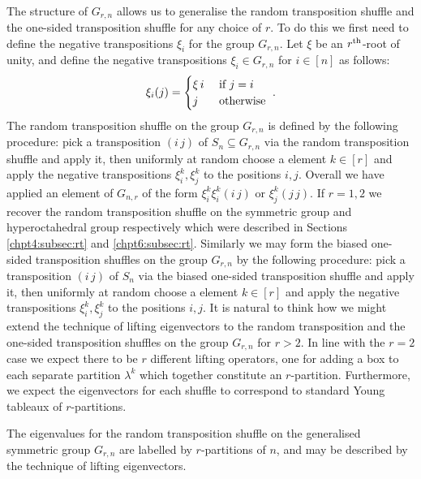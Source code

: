 \documentclass[11pt]{report}
\begin{document}
\paragraph{}
The structure of $G_{r,n}$ allows us to generalise the random transposition shuffle and the one-sided transposition shuffle for any choice of $r$. To do this we first need to define the negative transpositions $\xi_{i}$ for the group $G_{r,n}$. Let $\xi$ be an $r^{\textnormal{th}}$-root of unity, and define the negative transpositions $\xi_{i} \in G_{r,n}$ for $i\in [n]$ as follows:
\[\xi_{i}(j) = \begin{cases}
\xi \,i & \textnormal{ if } j= i\\
j & \textnormal{ otherwise }
\end{cases}
.\]
The random transposition shuffle on the group $G_{r,n}$ is defined by the following procedure: pick a transposition $(i\,j)$ of $S_{n} \subseteq G_{r,n}$ via the random transposition shuffle and apply it, then uniformly at random choose a element $k \in [r]$ and apply the negative transpositions $\xi_{i}^{k}, \xi_{j}^{k}$ to the positions $i,j$. Overall we have applied an element of $G_{n,r}$ of the form $\xi_{i}^{k}\xi_{i}^{k} (i \,j)$ or $\xi_{j}^{k} (j \, j)$. If $r=1,2$ we recover the random transposition shuffle on the symmetric group and hyperoctahedral group respectively which were described in Sections \ref{chpt4:subsec:rt} and \ref{chpt6:subsec:rt}. Similarly we may form the biased one-sided transposition shuffles on the group $G_{r,n}$ by the following procedure:
pick a transposition $(i\,j)$ of $S_{n}$ via the biased one-sided transposition shuffle and apply it, then uniformly at random choose a element $k \in [r]$ and apply the negative transpositions $\xi_{i}^{k}, \xi_{j}^{k}$ to the positions $i,j$.
It is natural to think how we might extend the technique of lifting eigenvectors to the random transposition and the one-sided transposition shuffles on the group $G_{r,n}$ for $r>2$. In line with the $r=2$ case we expect there to be $r$ different lifting operators, one for adding a box to each separate partition $\lambda^{k}$ which together constitute an $r$-partition. Furthermore, we expect the eigenvectors for each shuffle to correspond to standard Young tableaux of $r$-partitions.

\begin{conj}
	The eigenvalues for the random transposition shuffle on the generalised symmetric group $G_{r,n}$ are labelled by $r$-partitions of $n$, and may be described by the technique of lifting eigenvectors. 
\end{conj}
\end{document}
